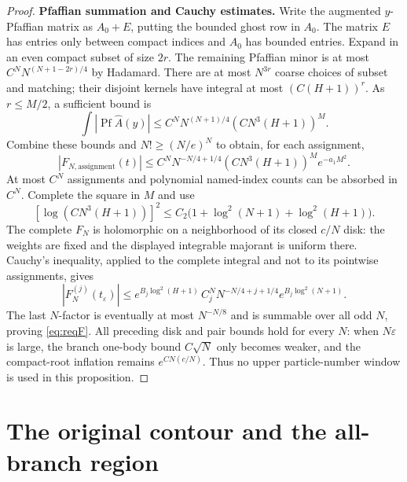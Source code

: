 \documentclass[11pt]{article}
\numberwithin{equation}{section}
\theoremstyle{definition}
\newcommand{\eps}{\varepsilon}
\newcommand{\Pf}{\operatorname{Pf}}
\begin{document}
\begin{proof}
\par\smallskip\noindent\textbf{Pfaffian summation and Cauchy estimates.} Write the augmented \(y\)-Pfaffian matrix as \(A_0+E\), putting the bounded ghost row in \(A_0\). The matrix \(E\) has entries
only between compact indices and \(A_0\) has bounded entries.
Expand in an even compact subset of size \(2r\). The remaining
Pfaffian minor is at most \(C^N N^{(N+1-2r)/4}\) by Hadamard.
There are at most \(N^{3r}\) coarse choices of subset and matching;
their disjoint kernels have integral at most \((C(H+1))^r\).
As \(r\le M/2\), a sufficient bound is
\[
 \int|\Pf\widehat A(y)|\le C^N N^{(N+1)/4}(CN^3(H+1))^M.
 \]
Combine these bounds and \(N!\ge(N/e)^N\) to obtain, for each assignment,
\[
 |F_{N,\mathrm{assignment}}(t)|
 \le C^N N^{-N/4+1/4}(CN^3(H+1))^M e^{-a_1M^2}.
 \]
At most $C^N$ assignments and polynomial named-index counts can be
absorbed in $C^N$. Complete the square in $M$ and use
\[
 [\log(CN^3(H+1))]^2\le C_2\bigl(1+\log^2(N+1)+\log^2(H+1)\bigr).
\]
The complete $F_N$ is holomorphic on a neighborhood of its closed
$c/N$ disk: the weights are fixed and the displayed integrable
majorant is uniform there. Cauchy's inequality, applied to the
complete integral and not to its pointwise assignments, gives
\[
 |F_N^{(j)}(t_\eps)|\le
 e^{B_j\log^2(H+1)}\,
 C_j^N N^{-N/4+j+1/4}e^{B_j\log^2(N+1)}.
\]
The last $N$-factor is eventually at most $N^{-N/8}$ and is
summable over all odd $N$, proving \eqref{eq:reqF}. All preceding
disk and pair bounds hold for every $N$: when $N\eps$ is large,
the branch one-body bound $C\sqrt N$ only becomes weaker, and
the compact-root inflation remains $e^{CN(c/N)}$. Thus no upper
particle-number window is used in this proposition.
\end{proof}



\section{The original contour and the all-branch region}
\label{sec:K}
\end{document}
